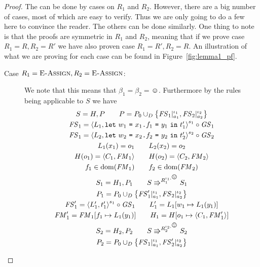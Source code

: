 \begin{proof}
  The can be done by cases on $R_1$ and $R_2$. However, there are a big number
  of cases, most of which are easy to verify. Thus we are only going to do a few
  here to convince the reader. The others can be done similarly. One thing to
  note is that the proofs are symmetric in $R_1$ and $R_2$, meaning that if we
  prove case $R_1 = R, R_2 = R'$ we have also proven case $R_1 = R', R_2 = R$.
  An illustration of what we are proving for each case can be found in
  Figure~\ref{fig:lemma1_pf}.

  \begin{description}
    \item[Case $R_1 = \mbox{{\sc E-Assign}}, R_2 = \mbox{{\sc E-Assign}}$:] We note that this means that
      $\beta_1 = \beta_2 = \smiley$. Furthermore by the rules being applicable
      to $S$ we have
      \begin{equation}
        \begin{gathered}
          S = H, P \andalso P = P_0 \cup_D \left\{ \FS_1|_{a_1}^{\iota_1},
          \FS_2|_{a_2}^{\iota_2} \right\} \\
          \FS_1 = \xframe{L_1, \Let{w_1}{\FAss{x_1}{f_1}{y_1}}{t'_1}}^{s_1} \circ \GS_1
          \\ 
          \FS_1 = \xframe{L_2, \Let{w_2}{\FAss{x_2}{f_2}{y_2}}{t'_2}}^{s_2}
          \circ \GS_2 \\
          L_1(x_1) = o_1 \andalso L_2(x_2) = o_2 \\
          H(o_1) = \Obj{C_1, \FM_1} \andalso H(o_2) = \Obj{C_2, \FM_2} \\
          f_1 \in \dom(\FM_1) \andalso f_2 \in \dom(\FM_2) \\
          S_1 = H_1, P_1 \andalso S \Rrightarrow^{R_1^{\iota_1, \smiley}} S_1
          \\
          P_1 = P_0 \cup_D \left\{ \FS'_1|_{a_1}^{\iota_1},
          \FS_2|_{a_2}^{\iota_2} \right\} \\
          \FS'_1 = \xframe{L'_1, t'_1}^{s_1} \circ \GS_1  \andalso L'_1 = L_1[w_1 \mapsto
          L_1(y_1)] \\
          \FM'_1 = \FM_1[f_1 \mapsto L_1(y_1)] \andalso H_1 = H[o_1 \mapsto
          \Obj{C_1, \FM'_1}]
          \\
          S_2 = H_2, P_2 \andalso S \Rrightarrow^{R_2^{\iota_2, \smiley}} S_2
          \\
          P_2 = P_0 \cup_D \left\{ \FS_1|_{a_1}^{\iota_1},
          \FS'_2|_{a_2}^{\iota_2} \right\} \\

\end{gathered}
\end{equation}
\end{description}
\end{proof}
